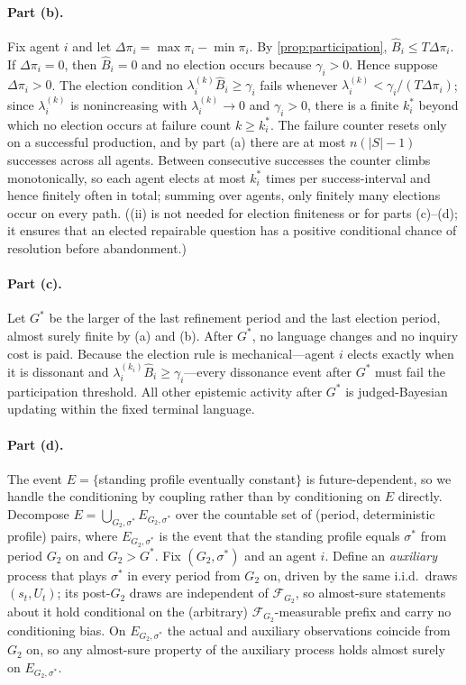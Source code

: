 \documentclass[11pt]{article}
\theoremstyle{definition}
\begin{document}
\paragraph{Part (b).}
Fix agent $i$ and let $\Delta \pi_i=\max \pi_i-\min \pi_i$.
By \cref{prop:participation}, $\widehat B_i\leq T\Delta \pi_i$.
If $\Delta \pi_i=0$, then $\widehat B_i=0$ and no election occurs because $\gamma_i>0$.
Hence suppose $\Delta \pi_i>0$.
The election condition $\lambda_i^{(k)}\widehat B_i\geq\gamma_i$ fails whenever $\lambda_i^{(k)}<\gamma_i/(T\Delta \pi_i)$; since $\lambda_i^{(k)}$ is nonincreasing with $\lambda_i^{(k)}\to0$ and $\gamma_i>0$, there is a finite $k_i^{*}$ beyond which no election occurs at failure count $k\geq k_i^{*}$.
The failure counter resets only on a successful production, and by part (a) there are at most $n(\lvert S\rvert-1)$ successes across all agents.
Between consecutive successes the counter climbs monotonically, so each agent elects at most $k_i^{*}$ times per success-interval and hence finitely often in total; summing over agents, only finitely many elections occur on every path.
((ii) is not needed for election finiteness or for parts (c)--(d); it ensures that an elected repairable question has a positive conditional chance of resolution before abandonment.)

\paragraph{Part (c).}
Let $G^{*}$ be the larger of the last refinement period and the last election period, almost surely finite by (a) and (b).
After $G^{*}$, no language changes and no inquiry cost is paid.
Because the election rule is mechanical---agent $i$ elects exactly when it is dissonant and $\lambda_i^{(k_i)}\widehat B_i\geq\gamma_i$---every dissonance event after $G^{*}$ must fail the participation threshold.
All other epistemic activity after $G^{*}$ is judged-Bayesian updating within the fixed terminal language.

\paragraph{Part (d).}
The event $E=\{$standing profile eventually constant$\}$ is future-dependent, so we handle the conditioning by coupling rather than by conditioning on $E$ directly.
Decompose $E=\bigcup_{G_2,\sigma^{*}}E_{G_2,\sigma^{*}}$ over the countable set of (period, deterministic profile) pairs, where $E_{G_2,\sigma^{*}}$ is the event that the standing profile equals $\sigma^{*}$ from period $G_2$ on and $G_2>G^{*}$.
Fix $(G_2,\sigma^{*})$ and an agent $i$.
Define an \emph{auxiliary} process that plays $\sigma^{*}$ in every period from $G_2$ on, driven by the same i.i.d.\ draws $(s_t,U_t)$; its post-$G_2$ draws are independent of $\mathcal F_{G_2}$, so almost-sure statements about it hold conditional on the (arbitrary) $\mathcal F_{G_2}$-measurable prefix and carry no conditioning bias.
On $E_{G_2,\sigma^{*}}$ the actual and auxiliary observations coincide from $G_2$ on, so any almost-sure property of the auxiliary process holds almost surely on $E_{G_2,\sigma^{*}}$.
\end{document}
